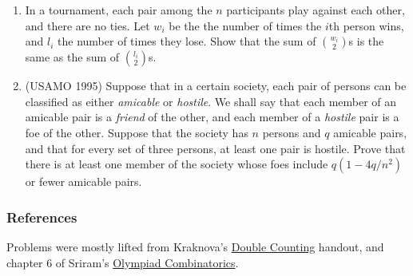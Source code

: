 \documentclass[11pt,paper=letter]{scrartcl}
\begin{document}
\begin{enumerate}

\item In a tournament, each pair among the $n$ participants play against each other, and there are no ties. Let $w_i$ be the the number of times the $i$th person wins, and $l_i$ the number of times they lose. Show that the sum of $\binom{w_i}{2}$s is the same as the sum of $\binom{l_i}{2}$s.




\item (USAMO 1995) Suppose that in a certain society, each pair of persons can be classified as either \textit{amicable} or \textit{hostile}. We shall say that each member of an amicable pair is a \textit{friend} of the other, and each member of a \textit{hostile} pair is a foe of the other. Suppose that the society has $n$ persons and $q$ amicable pairs, and that for every set of three persons, at least one pair is hostile. Prove that there is at least one member of the society whose foes include $q(1 - 4q/n^2)$ or fewer amicable pairs.

 
\end{enumerate}

\subsubsection*{References}

Problems were mostly lifted from Kraknova's \href{https://euclid.ucc.ie/mathenr/IMOTraining/2010 Summer Camp - Victoria Krakovna - Double Counting.pdf}{Double Counting} handout, and chapter 6 of Sriram's \href{https://euclid.ucc.ie/mathenr/IMOTraining/CombinatoricsChapter6 Aug 2014.pdf}{Olympiad Combinatorics}.
\end{document}
